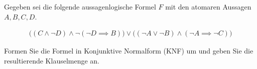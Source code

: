 \documentclass{uebungsblatt}
\begin{document}


\begin{aufgabe}
Gegeben sei die folgende aussagenlogische Formel $F$ mit den atomaren Aussagen $A, B, C, D$.

\begin{align*}
\bigl((C \land \neg D) \land \neg (\neg D \implies B)\bigr) 
\lor 
\bigl((\neg A \lor \neg B) \land (\neg A \implies \neg C)\bigr)
\end{align*}

Formen Sie die Formel in Konjunktive Normalform (KNF) um und geben Sie die resultierende Klauselmenge an.\\


\end{aufgabe}
\begin{loesung} 

\end{loesung}
\newpage
\end{document}
